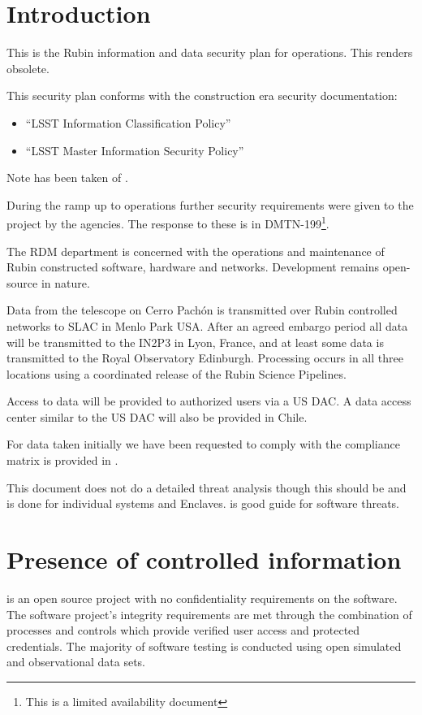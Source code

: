 

\section{Introduction}
This is the Rubin information and data security plan for operations.
This renders  obsolete.

This security plan conforms with the construction era security documentation:
\begin{itemize}
\item “LSST Information Classification Policy” 
\item “LSST Master Information Security Policy” 
\end{itemize}

Note has been taken of \cite{TCISSG}.

During the ramp up to operations further security requirements were given to the project by the agencies.
The response to these is in \gls{DMTN}-199\footnote{This is a limited availability document}.

The \gls{RDM} department is concerned with the operations and maintenance  of Rubin constructed software, hardware and networks.
Development remains open-source in nature.

Data from the telescope on Cerro Pach\'{o}n is transmitted over Rubin controlled networks to \gls{SLAC} in  Menlo Park USA.
After an agreed embargo period all data will be transmitted to the \gls{IN2P3} in Lyon, France, and at least some data is transmitted to the Royal Observatory Edinburgh.
Processing occurs in all three locations using a coordinated release of the Rubin \gls{Science Pipelines}.

Access to data will be provided to authorized  users via a US \gls{DAC}.
A data access center similar to the \gls{US} \gls{DAC} will also be provided in Chile.

For data taken initially we have been requested to comply with  the compliance matrix is provided in  .


This document does not do a detailed threat analysis though this should be and is done for individual systems and \gls{Enclave}s. \cite{TCISSG} is good guide for software threats.

\section{Presence of controlled information}\label{sec:cui}
\VRO is an open source project with no confidentiality requirements on the software.
The software project’s integrity requirements are met through the combination of
processes and controls which provide verified user access and protected credentials.
The majority of software testing is conducted using open simulated and observational data sets.

